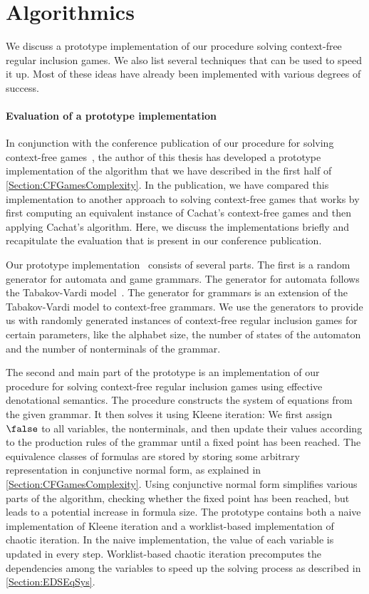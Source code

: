 \documentclass[../../diss.tex]{subfiles}
\begin{document}
\section{Algorithmics}%
\label{Section:CFGamesAlgorithmics}%

We discuss a prototype implementation of our procedure solving context-free regular inclusion games.
We also list several techniques that can be used to speed it up.
Most of these ideas have already been implemented with various degrees of success.

\paragraph{Evaluation of a prototype implementation}

In conjunction with the conference publication of our procedure for solving context-free games~\cite{HolikMM16}, the author of this thesis has developed a prototype implementation of the algorithm that we have described in the first half of \cref{Section:CFGamesComplexity}.
In the publication, we have compared this implementation to another approach to solving context-free games that works by first computing an equivalent instance of Cachat's context-free games and then applying Cachat's algorithm.
Here, we discuss the implementations briefly and recapitulate the evaluation that is present in our conference publication.

Our prototype implementation~\cite{Muskalla16} consists of several parts.
The first is a random generator for automata and game grammars.
The generator for automata follows the Tabakov-Vardi model~\cite{TabakovV05}.
The generator for grammars is an extension of the Tabakov-Vardi model to context-free grammars.
We use the generators to provide us with randomly generated instances of context-free regular inclusion games for certain parameters, like the alphabet size, the number of states of the automaton and the number of nonterminals of the grammar.

The second and main part of the prototype is an implementation of our procedure for solving context-free regular inclusion games using effective denotational semantics.
The procedure constructs the system of equations from the given grammar.
It then solves it using Kleene iteration:
We first assign $\false$ to all variables, \ie the nonterminals, and then update their values according to the production rules of the grammar until a fixed point has been reached.
The equivalence classes of formulas are stored by storing some arbitrary representation in conjunctive normal form, as explained in \cref{Section:CFGamesComplexity}.
Using conjunctive normal form simplifies various parts of the algorithm, \eg checking whether the fixed point has been reached, but leads to a potential increase in formula size.
The prototype contains both a naive implementation of Kleene iteration and a worklist-based implementation of chaotic iteration.
In the naive implementation, the value of each variable is updated in every step.
Worklist-based chaotic iteration precomputes the dependencies among the variables to speed up the solving process as described in \cref{Section:EDSEqSys}.
\end{document}
